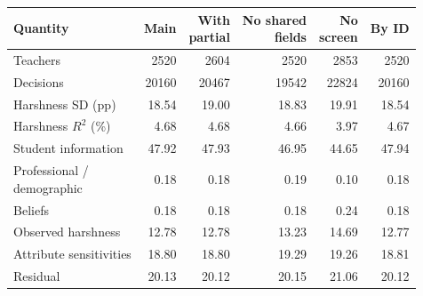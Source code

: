 \begin{tabular}{p{3.7cm}rrrrr}
\toprule
Quantity & Main & \shortstack{With\\partial} & \shortstack{No shared\\fields} & \shortstack{No\\screen} & By ID \\
\midrule
Teachers & 2520 & 2604 & 2520 & 2853 & 2520 \\
Decisions & 20160 & 20467 & 19542 & 22824 & 20160 \\
Harshness SD (pp) & 18.54 & 19.00 & 18.83 & 19.91 & 18.54 \\
Harshness $R^2$ (\%) & 4.68 & 4.68 & 4.66 & 3.97 & 4.67 \\
Student information & 47.92 & 47.93 & 46.95 & 44.65 & 47.94 \\
\shortstack[l]{Professional /\\demographic} & 0.18 & 0.18 & 0.19 & 0.10 & 0.18 \\
Beliefs & 0.18 & 0.18 & 0.18 & 0.24 & 0.18 \\
Observed harshness & 12.78 & 12.78 & 13.23 & 14.69 & 12.77 \\
Attribute sensitivities & 18.80 & 18.80 & 19.29 & 19.26 & 18.81 \\
Residual & 20.13 & 20.12 & 20.15 & 21.06 & 20.12 \\
\bottomrule
\end{tabular}
